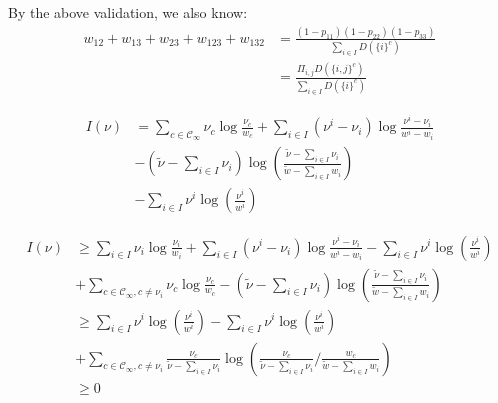 \documentclass[11pt,en,cite=authoryear]{elegantpaper}
\begin{document}
By the above validation, we also know:
\begin{align*}
    w_{12}+w_{13}+w_{23}+w_{123}+w_{132} &= \frac{(1-p_{11})(1-p_{22})(1-p_{33})}{\sum_{i\in I} D(\{i\}^c)} \\
    &= \frac{\Pi_{i, j} D(\{i, j\}^c)}{\sum_{i\in I} D(\{i\}^c)}
\end{align*}

\begin{align*}
    I(\nu) &= \sum_{c \in \mathcal{C}_{\infty}} \nu_{c} \log \frac{\nu_{c}}{w_c} + \sum_{i\in I}(\nu^i - \nu_i)\log \frac{\nu^i - \nu_i}{w^i - w_i} \\
    &-(\tilde{\nu} - \sum_{i\in I}\nu_i)\log(\frac{\tilde{\nu} - \sum_{i\in I}\nu_i}{\tilde{w} - \sum_{i\in I}w_i}) \\
    &-\sum_{i\in I} \nu^i \log (\frac{\nu^i}{w^i})
\end{align*}

\begin{align*}
    I(\nu) &\ge \sum_{i\in I} \nu_{i}\log \frac{\nu_{i}}{w_i} + \sum_{i\in I}(\nu^i - \nu_i)\log \frac{\nu^i - \nu_i}{w^i - w_i} 
    - \sum_{i\in I} \nu^i \log (\frac{\nu^i}{w^i})\\
    &+ \sum_{c \in \mathcal{C}_{\infty}, c\neq \nu_{i}} \nu_{c} \log \frac{\nu_{c}}{w_c} 
    -(\tilde{\nu} - \sum_{i\in I}\nu_i)\log(\frac{\tilde{\nu} - \sum_{i\in I}\nu_i}{\tilde{w} - \sum_{i\in I}w_i}) \\
    &\ge \sum_{i\in I} \nu^i \log (\frac{\nu^i}{w^i}) - \sum_{i\in I} \nu^i \log (\frac{\nu^i}{w^i})\\
    &+ \sum_{c \in \mathcal{C}_{\infty}, c\neq \nu_{i}} \frac{\nu_{c}}{\tilde{\nu} - \sum_{i\in I}\nu_i} \log (\frac{\nu_{c}}{\tilde{\nu} - \sum_{i\in I}\nu_i} / \frac{w_{c}}{\tilde{w} - \sum_{i\in I}w_{i}}) \\
    &\ge 0
\end{align*}
\end{document}
